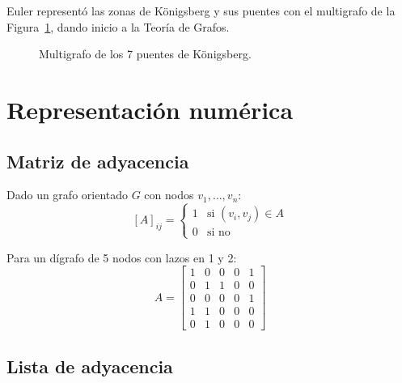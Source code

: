 \begin{ejemplo}
Euler representó las zonas de Königsberg y sus puentes con el multigrafo de la Figura~\ref{fig:konigsberg}, dando inicio a la Teoría de Grafos.
\end{ejemplo}

\begin{figure}[htbp]
\centering
{}
\caption{Multigrafo de los 7 puentes de Königsberg.}
\label{fig:konigsberg}
\end{figure}

\section{Representación numérica}

\subsection{Matriz de adyacencia}

Dado un grafo orientado $G$ con nodos $v_1, \ldots, v_n$:
\[
[A]_{ij} = \begin{cases} 1 & \text{si } (v_i, v_j) \in A \\ 0 & \text{si no} \end{cases}
\]

\begin{ejemplo}
Para un dígrafo de 5 nodos con lazos en 1 y 2:
\[
A = \begin{bmatrix}
1 & 0 & 0 & 0 & 1 \\
0 & 1 & 1 & 0 & 0 \\
0 & 0 & 0 & 0 & 1 \\
1 & 1 & 0 & 0 & 0 \\
0 & 1 & 0 & 0 & 0
\end{bmatrix}
\]
\end{ejemplo}

\subsection{Lista de adyacencia}

